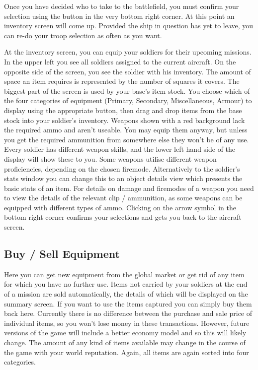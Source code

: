 Once you have decided who to take to the battlefield, you must confirm your selection using the button in the very bottom right corner.  At this point an inventory screen will come up. Provided the ship in question has yet to leave, you can re-do your troop selection as often as you want.

At the inventory screen, you can equip your soldiers for their upcoming missions. In the upper left you see all soldiers assigned to the current aircraft. On the opposite side of the screen, you see the soldier with his inventory. The amount of space an item requires is represented by the number of squares it covers. The biggest part of the screen is used by your base's item stock. You choose which of the four categories of equipment (Primary, Secondary, Miscellaneous, Armour) to display using the appropriate button, then drag and drop items from the base stock into your soldier's inventory.  Weapons shown with a red background lack the required ammo and aren't useable. You may equip them anyway, but unless you get the required ammunition from somewhere else they won't be of any use. Every soldier has different weapon skills, and the lower left hand side of the display will show these to you. Some weapons utilise different weapon proficiencies, depending on the chosen firemode. Alternatively to the soldier's stats window you can change this to an object details view which presents the basic stats of an item. For details on damage and firemodes of a weapon you need to view the details of the relevant clip / ammunition, as some weapons can be equipped with different types of ammo. Clicking on the arrow symbol in the bottom right corner confirms your selections and gets you back to the aircraft screen.

\subsection{Buy / Sell Equipment}
Here you can get new equipment from the global market or get rid of any item for which you have no further use. Items not carried by your soldiers at the end of a mission are sold automatically, the details of which will be displayed on the summary screen. If you want to use the items captured you can simply buy them back here. Currently there is no difference between the purchase and sale price of individual items, so you won't lose money in these transactions.  However, future versions of the game will include a better economy model and so this will likely change.  The amount of any kind of items available may change in the course of the game with your world reputation.  Again, all items are again sorted into four categories.

